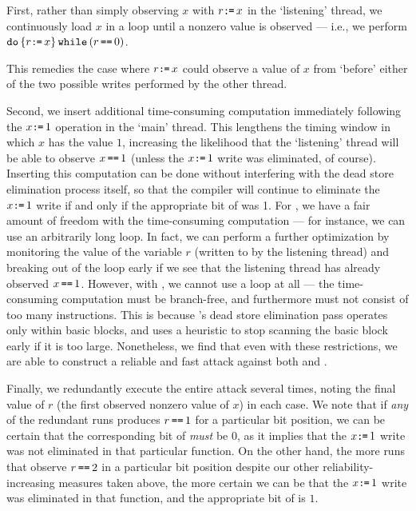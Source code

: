 First, rather than simply observing $x$ with $r\texttt{:}\mkern-1mu\texttt{=}\, x$ in the
`listening' thread, we continuously load $x$ in a loop until a
nonzero value is observed --- i.e., we perform
$\texttt{do}\,\{r\texttt{:}\mkern-1mu\texttt{=}\, x\}\, \texttt{while}\,(r\,\texttt{==}\,0)$.
This remedies the case where $r\texttt{:}\mkern-1mu\texttt{=}\, x$ could observe a value of $x$
from `before' either of the two possible writes performed by the other thread.

Second, we insert additional time-consuming computation immediately following
the $x\texttt{:}\mkern-1mu\texttt{=}\, 1$ operation in the `main' thread.
This lengthens the timing window in which $x$ has the value $1$,
increasing the likelihood that the `listening' thread will be able to observe
$x\,\texttt{==}\, 1$ (unless the $x\texttt{:}\mkern-1mu\texttt{=}\, 1$ write was eliminated, of course).
Inserting this computation can be done without interfering with the dead store
elimination process itself, so that the compiler will continue to eliminate
the $x\texttt{:}\mkern-1mu\texttt{=}\, 1$ write if and only if the appropriate bit of {\SEC}
was 1.
For {\GCC}, we have a fair amount of freedom with the time-consuming
computation --- for instance, we can use an arbitrarily long loop.
In fact, we can perform a further optimization by monitoring the value of the
variable $r$ (written to by the listening thread) and breaking out of the
loop early if we see that the listening thread has already observed $x\,\texttt{==}\, 1$.
However, with {\CLANG}, we cannot use a loop at all --- the time-consuming
computation must be branch-free, and furthermore must not consist of too many
instructions.
This is because {\CLANG}'s dead store elimination pass operates only
within basic blocks, and uses a heuristic to stop scanning the basic block
early if it is too large.
Nonetheless, we find that even with these restrictions, we are able to
construct a reliable and fast attack against both {\CLANG} and {\GCC}.

Finally, we redundantly execute the entire attack several times, noting the
final value of $r$ (the first observed nonzero value of $x$) in each
case.
We note that if \emph{any} of the redundant runs produces $r\,\texttt{==}\, 1$ for a
particular bit position, we can be certain that the corresponding bit of
{\SEC} \emph{must} be $0$, as it implies that the $x\texttt{:}\mkern-1mu\texttt{=}\, 1$ write
was not eliminated in that particular function.
On the other hand, the more runs that observe $r\,\texttt{==}\, 2$ in a particular bit
position despite our other reliability-increasing measures taken above, the
more certain we can be that the $x\texttt{:}\mkern-1mu\texttt{=}\, 1$ write was eliminated in that
function, and the appropriate bit of {\SEC} is $1$.

